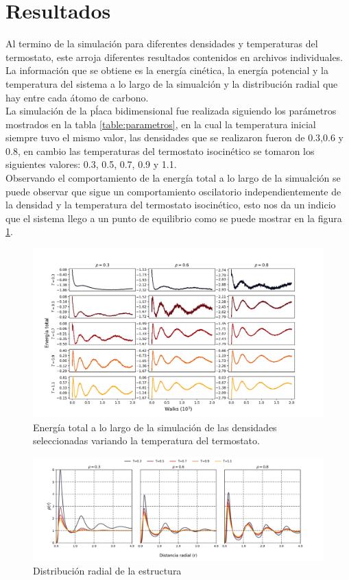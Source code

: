 \documentclass[reprint,amsmath,amssymb,aps,]{revtex4-2}
\begin{document}
\section{Resultados}
Al termino de la simulación para diferentes densidades y temperaturas del termostato, este arroja diferentes resultados contenidos en archivos individuales.
La información que se obtiene es la energía cinética, la energía potencial y la temperatura del sistema a lo largo de la simualción y la distribución radial que 
hay entre cada átomo de carbono.\\
La simulación de la pĺaca bidimensional fue realizada siguiendo los parámetros mostrados en la tabla \ref{table:parametros}, en la cual la temperatura inicial siempre tuvo el mismo valor,
las densidades que se realizaron fueron de 0.3,0.6 y 0.8, en cambio las temperaturas del termostato isocinético se tomaron los siguientes valores: 0.3, 0.5, 0.7, 0.9 y 1.1.\\
Observando el comportamiento de la energía total a lo largo de la simualción se puede observar que sigue un comportamiento oscilatorio
independientemente de la densidad y la temperatura del termostato isocinético, esto nos da un indicio que el sistema llego a un punto de
equilibrio como se puede mostrar en la figura \ref{fig:energy}.
\begin{figure}[H]
\hspace{-0.75cm}
\includegraphics[scale=0.275]{Images/Energy.png}
\caption{Energía total a lo largo de la simulación de las densidades seleccionadas variando la temperatura del termostato.}
\label{fig:energy}
\end{figure}
\begin{figure}
    \hspace*{-1cm}
    \includegraphics[scale=0.45]{Images/Dis_rad.png}
    \caption{Distribución radial de la estructura}
    \label{fig:disradial}
\end{figure}
\end{document}

